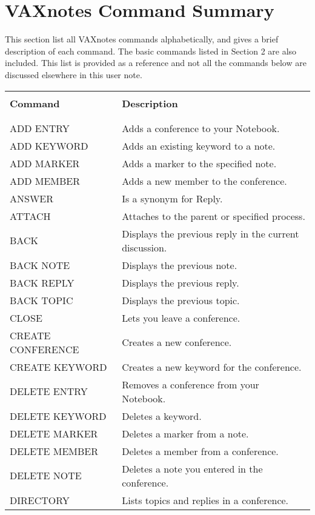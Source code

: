 \section {VAXnotes Command Summary}

This section list all VAXnotes commands alphabetically, and gives a brief description of each command. 
The basic commands listed in Section 2 are also included. This list is provided as a reference and
not all the commands below are discussed elsewhere in this user note.

\begin{tabular}{ l l }
& \\
\hline
& \\
{\large \bf Command}  & {\large \bf Description} \\
& \\
\hline
& \\
ADD ENTRY               &Adds a conference to your Notebook.\\
ADD KEYWORD		&Adds an existing keyword to a note.\\
ADD MARKER		&Adds a marker to the specified note.\\
ADD MEMBER		&Adds a new member to the conference.\\
ANSWER			&Is a synonym for Reply.\\
ATTACH			&Attaches to the parent or specified process.\\
BACK			&Displays the previous reply in the current discussion.\\
BACK NOTE		& Displays the previous note.\\
BACK REPLY 		& Displays the previous reply.\\
BACK TOPIC		& Displays the previous topic.\\
CLOSE			& Lets you leave a conference.\\
CREATE CONFERENCE	& Creates a new conference.\\
CREATE KEYWORD		& Creates a new keyword for the conference.\\
DELETE ENTRY		& Removes a conference from your Notebook.\\
DELETE KEYWORD		& Deletes a keyword.\\
DELETE MARKER		& Deletes a marker from a note.\\
DELETE MEMBER		& Deletes a member from a conference.\\
DELETE NOTE		& Deletes a note you entered in the conference.\\
DIRECTORY		& Lists topics and replies in a conference.\\

\end{tabular}
